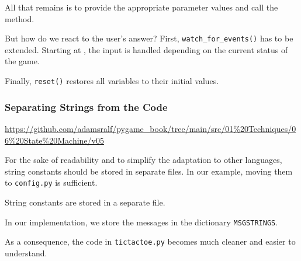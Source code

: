 All that remains is to provide the appropriate parameter values and call the method.



But how do we react to the user's answer? First, \texttt{watch\_for\_events()} has to be extended. Starting at , the input is handled depending on the current status of the game.

\newpage
{}

Finally, \texttt{reset()} restores all variables to their initial values.


\subsubsection{Separating Strings from the Code}
\begin{diskbox}
	\url{https://github.com/adamsralf/pygame_book/tree/main/src/01%20Techniques/06%20State%20Machine/v05}
\end{diskbox}

For the sake of readability and to simplify the adaptation to other languages, string constants should be stored in separate files. In our example, moving them to \texttt{config.py} is sufficient.

	String constants are stored in a separate file.
\er

In our implementation, we store the messages in the dictionary \texttt{MSGSTRINGS}.

\newpage
{}

As a consequence, the code in \texttt{tictactoe.py} becomes much cleaner and easier to understand.

